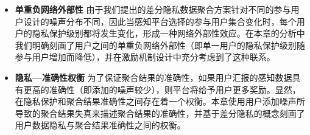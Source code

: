 \begin{itemize}
		\item {\bfseries 单重负网络外部性}
		由于我们提出的差分隐私数据聚合方案针对不同的参与用户设计的噪声分布不同，因此当感知平台选择的参与用户集合变化时，每个用户的隐私保护级别都将发生变化，形成一种网络外部性效应。在本章的分析中我们明确刻画了用户之间的单重负网络外部性（即单一用户的隐私保护级别随参与用户增加而降低），并在激励机制设计中充分考虑到了这种联系。
		
		
		
		
		
		
		\item {\bfseries 隐私—准确性权衡}
		为了保证聚合结果的准确性，如果用户汇报的感知数据具有更高的准确性（即添加的噪声较少），则平台将给予用户更多奖励。显然，在隐私保护和聚合结果准确性之间存在着一个权衡。本章使用用户添加噪声所导致的聚合结果失真来描述聚合结果的准确性，并基于差分隐私的概念刻画了用户数据隐私与聚合结果准确性之间的权衡。
		

\end{itemize}
